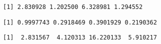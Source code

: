 \documentclass[]{book}
\newenvironment{Shaded}{\begin{snugshade}}{\end{snugshade}}
\newcommand{\KeywordTok}[1]{\textcolor[rgb]{0.13,0.29,0.53}{\textbf{#1}}}
\newcommand{\StringTok}[1]{\textcolor[rgb]{0.31,0.60,0.02}{#1}}
\newcommand{\CommentTok}[1]{\textcolor[rgb]{0.56,0.35,0.01}{\textit{#1}}}
\newcommand{\OperatorTok}[1]{\textcolor[rgb]{0.81,0.36,0.00}{\textbf{#1}}}
\newcommand{\NormalTok}[1]{#1}
\theoremstyle{definition}
\theoremstyle{definition}
\theoremstyle{definition}
\theoremstyle{remark}
\begin{document}
\begin{verbatim}
[1] 2.830928 1.202500 6.328981 1.294552
\end{verbatim}

\begin{Shaded}
\end{Shaded}

\begin{verbatim}
[1] 0.9997743 0.2918469 0.3901929 0.2190362
\end{verbatim}

\begin{Shaded}
\end{Shaded}

\begin{verbatim}
[1]  2.831567  4.120313 16.220133  5.910217
\end{verbatim}
\end{document}
